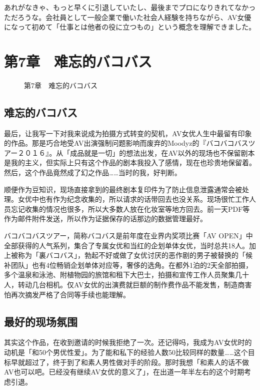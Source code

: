 \documentclass[12pt,UTF8]{ctexbook}
\begin{document}
あれがなきゃ、もっと早くに引退していたし、最後までプロになりきれてなかっただろうな。会社員として一般企業で働いた社会人経験を持ちながら、AV女優になって初めて「仕事とは他者の役に立つもの」という概念を理解できました。

\switchcolumn

\chapter{第7章　难忘的バコバス}

\begin{figure}[htbp]
    \centering
    \caption{第7章　难忘的バコバス}
    \label{fig:chapter7_cn}
\end{figure}

\section{难忘的バコバス}

最后，让我写一下对我来说成为拍摄方式转变的契机，AV女优人生中最留有印象的作品。那是巧合地受AV出演强制问题影响而废弃的Moodyz的『バコバコバスツアー２０１６』。从「成品就是一切」的想法出发，在AV以外的现场也不保留剧本是我的主义，但实际上只有这个作品的剧本我投入了感情，现在也珍贵地保留着。然后，这个作品竟然成了幻之作品……当时的我，好判断。

顺便作为豆知识，现场直接拿到的最终剧本复印件为了防止信息泄露通常会被处理。女优中也有作为纪念收集的，所以请求的话带回去也没关系。现场很忙工作人员忘记收集的情况也很多，所以大多数人放在化妆室等地方回去。前一天PDF等作为邮件附件发送，所以作为证据保存的话那边的数据管理最好。

バコバコバスツアー，简称バコバス是前年度在业界内奖项比赛「AV OPEN」中全部获得的人气系列，集合了专属女优和当红的企划单体女优，当时总共18人。加上被称为「裏バコバス」，勃起不好或做了女优讨厌的恶作剧的男子被替换的「候补团队」也有4位畅销企划单体对应等，奢侈的选角。在都外1泊的2天全部拍摄，多个温泉和泳池、附植物园的旅馆和租下大巴士，拍摄和宣传工作人员聚集几十人，转动几台相机。仅AV女优的出演费就巨额的制作费作品不能发售，制造商害怕再次摘发严格了合同等手续也能理解。

\section{最好的现场氛围}

其实这个作品，在收到邀请的时候我拒绝了一次。还记得吗，我成为AV女优时的动机是「和50个男优性爱」。为了能和私下的经验人数50比较同样的数量……这个目标早就超过了，终于到了和素人男性做对手的阶段。那时我想「和素人的话不做AV也可以吧。已经没有继续AV女优的意义了」，在出道一年半左右的这个时期考虑引退。
\end{document}
